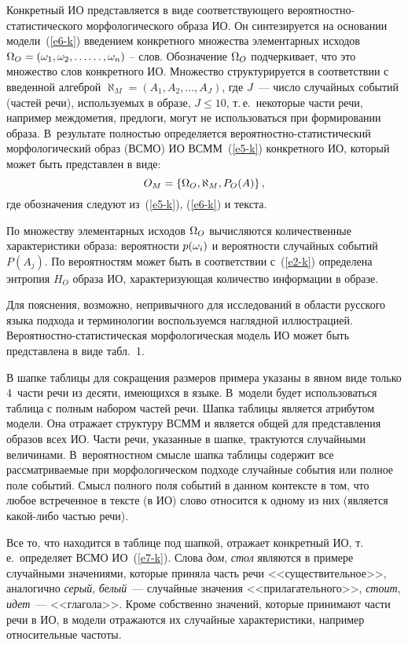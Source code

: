 \begin{multicols}{2}
   Конкретный ИО представляется в виде соответствующего 
   ве\-ро\-ят\-но\-ст\-но-ста\-ти\-сти\-че\-ско\-го морфологического образа 
ИО. Он синтезируется на основа\-нии модели~(\ref{e6-k}) введением 
конкретного множества элементарных исходов $\Omega_O= (\omega_1, \omega_2, \ldots$\linebreak $\ldots , 
\omega_n)$ -- слов. Обозначение $\Omega_O$ подчеркивает, что это множество слов 
конкретного ИО. Множество структурируется в соответствии с введенной 
ал\-геб\-рой $\aleph_M=(A_1, A_2, \ldots , A_J)$, где $J$~--- число случайных 
событий (частей речи), используемых в образе, $J\leq  10$, т.\,е.\ некоторые 
части речи, например междометия, предлоги, могут не использоваться при 
формировании образа. В~результате пол\-ностью определяется 
ве\-ро\-ят\-но\-ст\-но-ста\-ти\-сти\-че\-ский морфологический образ (ВСМО) ИО ВСММ~(\ref{e5-k}) 
конкретного ИО, который может быть представлен в виде:
   \begin{equation}
   O_M=\{ \Omega_O,\aleph_M,P_O(A)\}\,,
   \label{e7-k}
   \end{equation}
где обозначения следуют из~(\ref{e5-k}), (\ref{e6-k}) и текста. 
   
   По множеству элементарных исходов $\Omega_O$ вычисляются 
количественные характеристики образа: вероятности $p(\omega_i)$ и вероятности 
случайных событий $P(A_j)$. По вероятностям может быть в соответствии 
с~(\ref{e2-k}) определена энтропия $H_O$ образа ИО, характеризующая 
количество информации в об\-разе.
   
   Для пояснения, возможно, непривычного для исследований в области 
русского языка подхода и терминологии воспользуемся наглядной 
иллюстрацией. Вероятностно-ста\-ти\-сти\-че\-ская морфологическая
модель ИО может быть представлена в виде табл.~1.
   
   В шапке таблицы для сокращения размеров примера указаны в явном 
виде только 4~части речи из десяти, имеющихся в языке. В~модели будет 
использоваться таблица с полным набором частей речи. Шапка таблицы 
является атрибутом модели. Она отражает структуру ВСММ и является 
общей для представления образов всех ИО. Части речи, указанные в шапке, 
трактуются случайными величинами. В~вероятностном смысле шапка 
таблицы содержит все рассматриваемые при морфологическом подходе 
случайные события или полное поле событий. Смысл полного поля событий 
в данном контексте в том, что любое встреченное в тексте (в ИО) слово 
относится к одному из них (является ка\-кой-либо частью речи). 
   
   Все то, что находится в таблице под шапкой, отражает конкретный ИО, 
т.\,е.\ определяет ВСМО ИО~(\ref{e7-k}). Слова \textit{дом}, \textit{стол} 
являются в примере случайными значениями, которые приняла часть речи 
<<существительное>>, аналогично \textit{серый}, \textit{белый}~--- 
случайные значения <<прилагательного>>, \textit{стоит}, \textit{идет}~--- 
<<глагола>>. Кроме собственно значений, которые принимают части речи в 
ИО, в модели отражаются их случайные характеристики, например 
относительные частоты.
   

\end{multicols}
